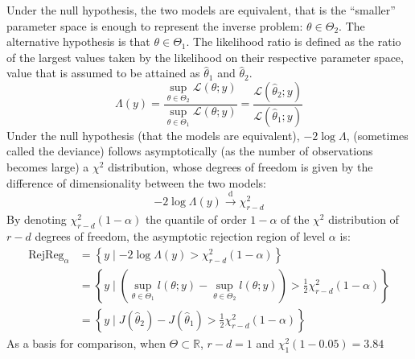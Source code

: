 \documentclass[../../Main_ManuscritThese.tex]{subfiles}
\begin{document}
Under the null hypothesis, the two models are equivalent, that is the ``smaller'' parameter space is enough to represent the inverse problem: $\theta \in \Theta_2$. The alternative hypothesis is that $\theta \in \Theta_1$.
The likelihood ratio is defined as the ratio of the largest values taken by the likelihood on their respective parameter space, value that is assumed to be attained as $\hat{\theta}_1$ and $\hat{\theta}_2$.
\begin{equation}
  \label{eq:def_lik_ratio}
  \Lambda(y) = \frac{\sup_{\theta \in \Theta_2} \mathcal{L}(\theta ; y)}{\sup_{\theta \in \Theta_1} \mathcal{L}(\theta ; y)} = \frac{\mathcal{L}(\hat{\theta}_2 ; y)}{\mathcal{L}(\hat{\theta}_1 ; y)}
\end{equation}
Under the null hypothesis (that the models are equivalent), $-2 \log \Lambda$, (sometimes called the deviance) follows asymptotically (as the number of observations becomes large) a $\chi^2$ distribution, whose degrees of freedom is given by the difference of dimensionality between the two models:
\begin{equation}
  - 2 \log \Lambda(y) \xrightarrow[]{\mathrm{d}} \chi^2_{r-d}
\end{equation}
By denoting $\chi^2_{r-d}(1-\alpha)$ the quantile of order $1-\alpha$ of the $\chi^2$ distribution of $r-d$ degrees of freedom, the asymptotic rejection region of level $\alpha$ is:
\begin{align}
  \mathrm{RejReg}_{\alpha} &= \left\{y \mid -2 \log \Lambda(y) > \chi^2_{r-d}(1-\alpha) \right\} \label{eq:LRT_rej_reg}\\
                           &= \left\{ y \mid (\sup_{\theta\in\Theta_1} l(\theta;y) - \sup_{\theta\in\Theta_2} l(\theta;y)) > \frac12 \chi^2_{r-d}(1-\alpha) \right\} \\
                             &= \left\{ y \mid J(\hat{\theta}_2) - J(\hat{\theta}_1) >  \frac12 \chi^2_{r-d}(1-\alpha) \right\}
\end{align}
As a basis for comparison, when $\Theta \subset \mathbb{R}$, $r-d=1$ and $\chi^2_1(1-0.05) =3.84$ 
\end{document}
